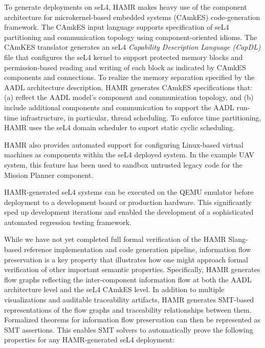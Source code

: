 To generate deployments on seL4, HAMR makes heavy use of the
component architecture for microkernel-based embedded systems
(CAmkES) code-generation framework.   The CAmkES input
language supports specification
of seL4 partitioning and communication topology using
component-oriented idioms.  The CAmKES translator generates an
seL4 \emph{Capability Description Language (CapDL)} file that
configures the seL4 kernel to support protected memory blocks
and permission-based reading and writing of each block as
indicated by CAmkES components and connections.
To realize the memory separation specified by the AADL
architecture description, HAMR generates CAmkES specifications
that: (a) reflect the AADL model's component and communication
topology, and (b) include additional components and communication
to support the AADL run-time infrastructure, in particular,
thread scheduling.
To enforce time partitioning, HAMR uses the seL4 domain
scheduler to suport static cyclic scheduling. 

HAMR also provides automated support for configuring Linux-based
virtual machines as components within the seL4 deployed system. 
In the example UAV system, this feature has been used to sandbox untrusted legacy code
for the Mission Planner component.


HAMR-generated seL4 systems can be executed on the QEMU emulator
before deployment to a development board or
production hardware.  This significantly sped up development
iterations and enabled the development of a sophisticated
automated regression testing framework.

While we have not yet completed full formal verification of
the HAMR Slang-based reference implementation and code generation
pipeline, information flow preservation is a key property that 
illustrates how one might approach formal verification of 
other important semantic properties.
Specifically, HAMR generates flow graphs reflecting the
inter-component information flow at both the AADL architecture
level and the seL4 CAmkES level.  In addition to multiple
visualizations and auditable traceability artifacts, HAMR
generates SMT-based representations of the flow graphs and
traceability relationships between them.  Formalized
theorems for information flow preservation can then be represented as
SMT assertions.  This enables SMT solvers to automatically prove
the following properties for any HAMR-generated seL4 deployment:

